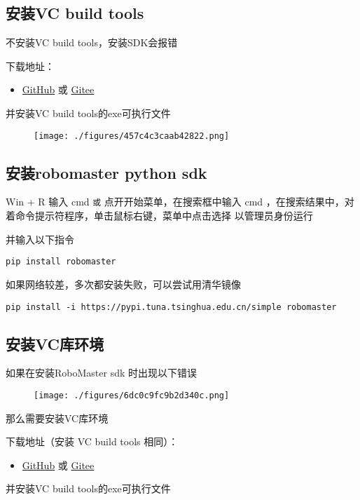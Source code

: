 
\begin{issues}
\issueTODO
\end{issues}

\subsection{安装VC build tools}
不安装VC build tools，安装SDK会报错

下载地址：\begin{itemize}
\item \href{https://github.com/dji-sdk/robomaster-sdk}{GitHub} 或 \href{https://gitee.com/xitinglin/RoboMaster-SDK}{Gitee}
\end{itemize}

并安装VC build tools的exe可执行文件

\begin{figure}[ht]
\centering
\texttt{[image: ./figures/457c4c3caab42822.png]}
\caption{} \label{fig_PyRM1_1}
\end{figure}

\subsection{安装robomaster python sdk}
Win + R 输入 cmd 
\verb|或|
点开开始菜单，在搜索框中输入 cmd ，在搜索结果中，对着命令提示符程序，单击鼠标右键，菜单中点击选择 以管理员身份运行 

并输入以下指令

\begin{lstlisting}[language=pythonC]
pip install robomaster
\end{lstlisting}

如果网络较差，多次都安装失败，可以尝试用清华镜像

\begin{lstlisting}[language=pythonC]
pip install -i https://pypi.tuna.tsinghua.edu.cn/simple robomaster
\end{lstlisting}

\subsection{安装VC库环境}
如果在安装RoboMaster sdk 时出现以下错误\begin{figure}[ht]
\centering
\texttt{[image: ./figures/6dc0c9fc9b2d340c.png]}
\caption{} \label{fig_PyRM1_2}
\end{figure}
那么需要安装VC库环境

下载地址（安装 VC build tools 相同）：\begin{itemize}
\item \href{https://github.com/dji-sdk/robomaster-sdk}{GitHub} 或 \href{https://gitee.com/xitinglin/RoboMaster-SDK}{Gitee}
\end{itemize}

并安装VC build tools的exe可执行文件

